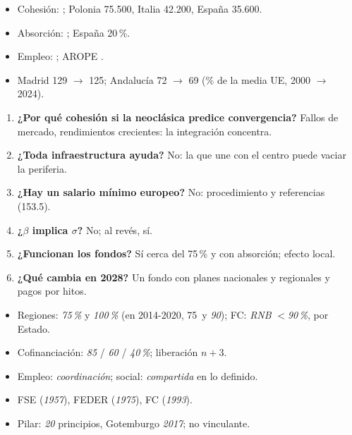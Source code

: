 \documentclass{article}
\begin{document}
\begin{columnas}
\anexorepaso
{}
\begin{itemize}
\item Cohesión: ; Polonia 75.500, Italia 42.200, España 35.600.
\item Absorción: ; España 20\,\%.
\item Empleo: ; AROPE .
\item Madrid 129 $\to$ 125; Andalucía 72 $\to$ 69 (\% de la media UE, 2000 $\to$ 2024).
\end{itemize}
\begin{enumerate}
\item \textbf{¿Por qué cohesión si la neoclásica predice convergencia?} Fallos de mercado, rendimientos crecientes: la integración concentra.
\item \textbf{¿Toda infraestructura ayuda?} No: la que une con el centro puede vaciar la periferia.
\item \textbf{¿Hay un salario mínimo europeo?} No: procedimiento y referencias (153.5).
\item \textbf{¿$\beta$ implica $\sigma$?} No; al revés, sí.
\item \textbf{¿Funcionan los fondos?} Sí cerca del 75\,\% y con absorción; efecto local.
\item \textbf{¿Qué cambia en 2028?} Un fondo con planes nacionales y regionales y pagos por hitos.
\end{enumerate}
\begin{trampa}
\begin{itemize}
\item Regiones: \emph{75\,\%} y \emph{100\,\%} (en 2014-2020, 75~y \emph{90}); FC: \emph{RNB} $<$\emph{90\,\%}, por Estado.
\item Cofinanciación: \emph{85} / \emph{60} / \emph{40\,\%}; liberación \emph{$n+3$}.
\item Empleo: \emph{coordinación}; social: \emph{compartida} en lo definido.
\item FSE (\emph{1957}), FEDER (\emph{1975}), FC (\emph{1993}).
\item Pilar: \emph{20} principios, Gotemburgo \emph{2017}; no vinculante.
\end{itemize}
\end{trampa}

\end{columnas}
\end{document}
